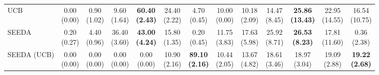 \begin{table}[H]
{\begin{tabular}{l|cccccc|cccccc}
UCB & \makecell{0.00 \\ (0.00)} & \makecell{0.90 \\ (1.02)} & {\cellcolor[HTML]{C8E6C9}} \makecell{9.60 \\ (1.64)} & \bfseries \makecell{60.40 \\ (2.43)} & \makecell{24.40 \\ (2.22)} & \makecell{4.70 \\ (0.45)} & \makecell{10.00 \\ (0.00)} & \makecell{10.18 \\ (2.09)} & {\cellcolor[HTML]{C8E6C9}} \makecell{14.47 \\ (8.45)} & \bfseries \makecell{25.86 \\ (13.43)} & \makecell{22.95 \\ (14.55)} & \makecell{16.54 \\ (10.75)} \\
SEEDA & \makecell{0.20 \\ (0.27)} & \makecell{4.40 \\ (0.96)} & {\cellcolor[HTML]{C8E6C9}} \makecell{36.40 \\ (3.60)} & \bfseries \makecell{43.00 \\ (4.24)} & \makecell{15.80 \\ (1.35)} & \makecell{0.20 \\ (0.45)} & \makecell{11.75 \\ (3.83)} & \makecell{17.63 \\ (5.98)} & {\cellcolor[HTML]{C8E6C9}} \makecell{25.92 \\ (8.71)} & \bfseries \makecell{26.53 \\ (8.23)} & \makecell{17.81 \\ (11.60)} & \makecell{0.36 \\ (2.38)} \\
SEEDA (UCB) & \makecell{0.00 \\ (0.00)} & \makecell{0.00 \\ (0.00)} & {\cellcolor[HTML]{C8E6C9}} \makecell{0.00 \\ (0.00)} & \makecell{0.00 \\ (0.00)} & \makecell{10.90 \\ (2.16)} & \bfseries \makecell{89.10 \\ (2.16)} & \makecell{10.44 \\ (2.05)} & \makecell{13.67 \\ (4.82)} & {\cellcolor[HTML]{C8E6C9}} \makecell{18.61 \\ (3.46)} & \makecell{18.97 \\ (3.04)} & \makecell{19.09 \\ (2.88)} & \bfseries \makecell{19.22 \\ (2.68)} \\

\end{tabular}}
\end{table}
